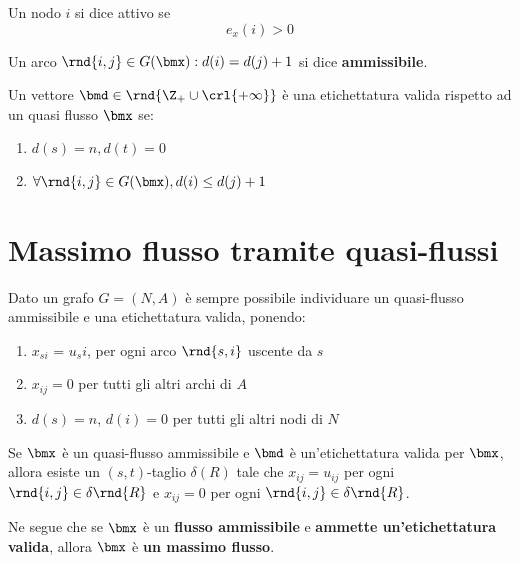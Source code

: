 \documentclass[\main/main.tex]{subfiles}
\begin{document}
\begin{definition}
  Un nodo \(i\) si dice attivo se \[e_x(i) > 0\]
\end{definition}
\begin{definition}
  Un arco \(\rnd{i,j} \in G(\bmx):  d(i) = d(j) +1\) si dice \textbf{ammissibile}.
\end{definition}
\begin{definition}
  Un vettore \(\bmd \in \rnd{\Z_+ \cup \crl{+\infty}}\) è una etichettatura valida rispetto ad un quasi flusso \(\bmx\) se:
  \begin{enumerate}
    \item \(d(s) = n, d(t) = 0\)
    \item \(\forall \rnd{i,j} \in G(\bmx), d(i) \leq d(j) +1\)
  \end{enumerate}
\end{definition}
\section{Massimo flusso tramite quasi-flussi}
Dato un grafo \(G = (N, A)\) è sempre possibile individuare un quasi-flusso ammissibile e una etichettatura valida, ponendo:

\begin{enumerate}
  \item \(x_{si}\) = \(u_si\), per ogni arco \(\rnd{s,i}\) uscente da \(s\)
  \item \(x_{ij} = 0\) per tutti gli altri archi di \(A\)
  \item \(d(s) = n\), \(d(i) = 0\) per tutti gli altri nodi di \(N\)
\end{enumerate}

\begin{theorem}
  Se \(\bmx\) è un quasi-flusso ammissibile e \(\bmd\) è un’etichettatura valida per \(\bmx\), allora esiste un \((s,t)\)-taglio \(\delta(R)\) tale che \(x_{ij}=u_{ij}\) per ogni \(\rnd{i,j}\in \delta\rnd{R}\) e \(x_{ij}=0\) per ogni \(\rnd{i,j} \in \delta\rnd{R}\).

  Ne segue che se \(\bmx\) è un \textbf{flusso ammissibile} e \textbf{ammette un’etichettatura valida}, allora \(\bmx\) è \textbf{un massimo flusso}.
\end{theorem}
\end{document}
